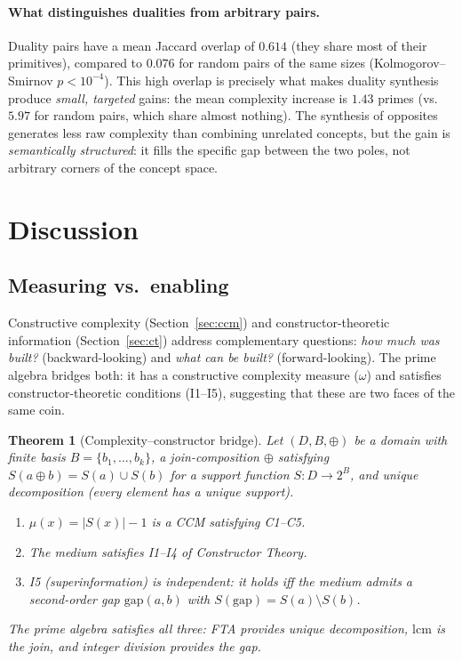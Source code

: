 \documentclass[11pt,a4paper]{article}
\newtheorem{theorem}{Theorem}
\begin{document}
\paragraph{What distinguishes dualities from arbitrary pairs.}
Duality pairs have a mean Jaccard overlap of $0.614$ (they share
most of their primitives), compared to $0.076$ for random pairs
of the same sizes (Kolmogorov--Smirnov $p < 10^{-4}$). This high
overlap is precisely what makes duality synthesis produce
\emph{small, targeted} gains: the mean complexity increase is
$1.43$ primes (vs.\ $5.97$ for random pairs, which share almost
nothing). The synthesis of opposites generates less raw complexity
than combining unrelated concepts, but the gain is
\emph{semantically structured}: it fills the specific gap between
the two poles, not arbitrary corners of the concept space.

\section{Discussion}
\label{sec:discussion}

\subsection{Measuring vs.\ enabling}

Constructive complexity (Section~\ref{sec:ccm}) and
constructor-theoretic information (Section~\ref{sec:ct}) address
complementary questions: \emph{how much was built?} (backward-looking)
and \emph{what can be built?} (forward-looking). The prime algebra
bridges both: it has a constructive complexity measure ($\omega$)
and satisfies constructor-theoretic conditions (I1--I5), suggesting
that these are two faces of the same coin.

\begin{theorem}[Complexity--constructor bridge]
\label{thm:bridge}
Let $(D,B,\oplus)$ be a domain with finite basis
$B=\{b_1,\ldots,b_k\}$, a join-composition $\oplus$ satisfying
$S(a\oplus b)=S(a)\cup S(b)$ for a support function
$S\colon D\to 2^B$, and unique decomposition (every element has a
unique support).
\begin{enumerate}[nosep]
\item[\textup{(i)}] $\mu(x)=|S(x)|-1$ is a CCM satisfying C1--C5.
\item[\textup{(ii)}] The medium satisfies I1--I4 of Constructor
  Theory.
\item[\textup{(iii)}] I5 (superinformation) is independent: it
  holds iff the medium admits a second-order gap
  $\mathrm{gap}(a,b)$ with $S(\mathrm{gap})=S(a)\setminus S(b)$.
\end{enumerate}
The prime algebra satisfies all three: FTA provides unique
decomposition, $\mathrm{lcm}$ is the join, and integer division
provides the gap.
\end{theorem}
\end{document}

